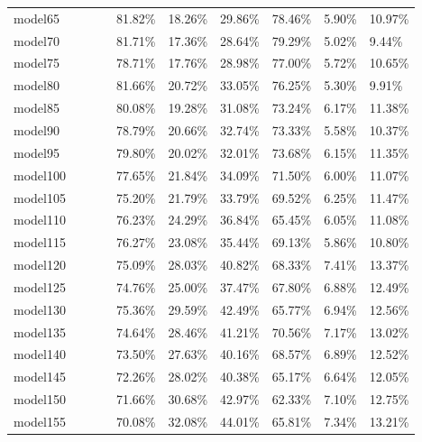 \begin{longtable}{@{}llllllllll@{}}
model65  &         &         &         & 81.82\%  & 18.26\% & 29.86\% & 78.46\%  & 5.90\%  & 10.97\% \\
model70  &         &         &         & 81.71\%  & 17.36\% & 28.64\% & 79.29\%  & 5.02\%  & 9.44\%  \\
model75  &         &         &         & 78.71\%  & 17.76\% & 28.98\% & 77.00\%  & 5.72\%  & 10.65\% \\
model80  &         &         &         & 81.66\%  & 20.72\% & 33.05\% & 76.25\%  & 5.30\%  & 9.91\%  \\
model85  &         &         &         & 80.08\%  & 19.28\% & 31.08\% & 73.24\%  & 6.17\%  & 11.38\% \\
model90  &         &         &         & 78.79\%  & 20.66\% & 32.74\% & 73.33\%  & 5.58\%  & 10.37\% \\
model95  &         &         &         & 79.80\%  & 20.02\% & 32.01\% & 73.68\%  & 6.15\%  & 11.35\% \\
model100 &         &         &         & 77.65\%  & 21.84\% & 34.09\% & 71.50\%  & 6.00\%  & 11.07\% \\
model105 &         &         &         & 75.20\%  & 21.79\% & 33.79\% & 69.52\%  & 6.25\%  & 11.47\% \\
model110 &         &         &         & 76.23\%  & 24.29\% & 36.84\% & 65.45\%  & 6.05\%  & 11.08\% \\
model115 &         &         &         & 76.27\%  & 23.08\% & 35.44\% & 69.13\%  & 5.86\%  & 10.80\% \\
model120 &         &         &         & 75.09\%  & 28.03\% & 40.82\% & 68.33\%  & 7.41\%  & 13.37\% \\
model125 &         &         &         & 74.76\%  & 25.00\% & 37.47\% & 67.80\%  & 6.88\%  & 12.49\% \\
model130 &         &         &         & 75.36\%  & 29.59\% & 42.49\% & 65.77\%  & 6.94\%  & 12.56\% \\
model135 &         &         &         & 74.64\%  & 28.46\% & 41.21\% & 70.56\%  & 7.17\%  & 13.02\% \\
model140 &         &         &         & 73.50\%  & 27.63\% & 40.16\% & 68.57\%  & 6.89\%  & 12.52\% \\
model145 &         &         &         & 72.26\%  & 28.02\% & 40.38\% & 65.17\%  & 6.64\%  & 12.05\% \\
model150 &         &         &         & 71.66\%  & 30.68\% & 42.97\% & 62.33\%  & 7.10\%  & 12.75\% \\
model155 &         &         &         & 70.08\%  & 32.08\% & 44.01\% & 65.81\%  & 7.34\%  & 13.21\% \\

\end{longtable}
